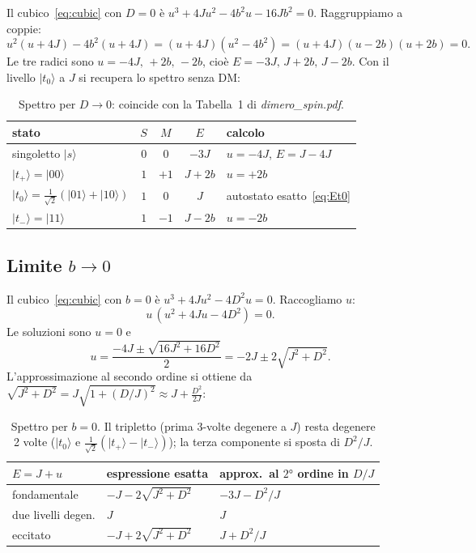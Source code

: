 \documentclass[11pt,a4paper]{article}
\newcommand{\ket}[1]{\lvert #1 \rangle}
\theoremstyle{definition}
\begin{document}
Il cubico~\eqref{eq:cubic} con $D=0$ è $u^3+4Ju^2-4b^2u-16Jb^2=0$. Raggruppiamo a coppie:
\[
u^2(u+4J)-4b^2(u+4J)=(u+4J)(u^2-4b^2)=(u+4J)(u-2b)(u+2b)=0.
\]
Le tre radici sono $u=-4J,\,+2b,\,-2b$, cioè $E=-3J,\,J+2b,\,J-2b$. Con il livello $\ket{t_0}$ a $J$
si recupera lo spettro senza DM:

\begin{table}[htbp]
\centering
\begin{tabular}{lcccl}
\toprule
stato & $S$ & $M$ & $E$ & calcolo \\
\midrule
singoletto $\ket{s}$ & $0$ & $0$ & $-3J$ & $u=-4J$, $E=J-4J$ \\
$\ket{t_+}=\ket{00}$ & $1$ & $+1$ & $J+2b$ & $u=+2b$ \\
$\ket{t_0}=\tfrac{1}{\sqrt2}(\ket{01}+\ket{10})$ & $1$ & $0$ & $J$ & autostato esatto~\eqref{eq:Et0} \\
$\ket{t_-}=\ket{11}$ & $1$ & $-1$ & $J-2b$ & $u=-2b$ \\
\bottomrule
\end{tabular}
\caption{Spettro per $D\to0$: coincide con la Tabella~1 di \textit{dimero\_spin.pdf}.}
\label{tab:D0}
\end{table}

\subsection{Limite $b\to0$}

Il cubico~\eqref{eq:cubic} con $b=0$ è $u^3+4Ju^2-4D^2u=0$. Raccogliamo $u$:
\[
u\,(u^2+4Ju-4D^2)=0.
\]
Le soluzioni sono $u=0$ e
\[
u=\frac{-4J\pm\sqrt{16J^2+16D^2}}{2}=-2J\pm2\sqrt{J^2+D^2}.
\]
L'approssimazione al secondo ordine si ottiene da $\sqrt{J^2+D^2}=J\sqrt{1+(D/J)^2}
\approx J+\tfrac{D^2}{2J}$:

\begin{table}[htbp]
\centering
\begin{tabular}{lll}
\toprule
$E=J+u$ & espressione esatta & approx.\ al $2°$ ordine in $D/J$ \\
\midrule
fondamentale & $-J-2\sqrt{J^2+D^2}$ & $-3J-D^2/J$ \\
due livelli degen. & $J$ & $J$ \\
eccitato & $-J+2\sqrt{J^2+D^2}$ & $J+D^2/J$ \\
\bottomrule
\end{tabular}
\caption{Spettro per $b=0$. Il tripletto (prima 3-volte degenere a $J$) resta degenere 2 volte
($\ket{t_0}$ e $\tfrac1{\sqrt2}(\ket{t_+}-\ket{t_-})$); la terza componente si sposta di $D^2/J$.}
\label{tab:b0}
\end{table}
\end{document}
